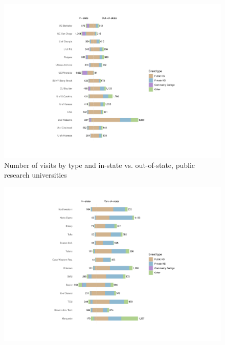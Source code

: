 \documentclass[
  12pt,
]{article}
\begin{document}
\begin{landscape}
\newpage

\begin{figure}

{\centering \includegraphics[width=2\linewidth]{../assets/figures/events_count_pubu} 

}

\caption{Number of visits by type and in-state vs. out-of-state, public research universities}\label{fig:events-count-pubu}
\end{figure}

\newpage

\begin{figure}

{\centering \includegraphics[width=2\linewidth]{../assets/figures/events_count_privu} 

}


\end{figure}
\end{landscape}
\end{document}
